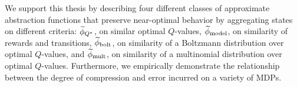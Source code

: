 We support this thesis by describing four different classes of approximate abstraction functions that preserve near-optimal behavior by aggregating states on different criteria: $\widetilde \phi_{Q^*}$, on similar optimal $Q$-values, $\widetilde \phi_{\text{model}}$, on similarity of rewards and transitions, $\widetilde \phi_{\text{bolt}}$, on similarity of a Boltzmann distribution over optimal $Q$-values, and $\widetilde \phi_{\text{mult}}$, on similarity of a multinomial distribution over optimal $Q$-values. Furthermore, we empirically demonstrate the relationship between the degree of compression and error incurred on a variety of \acp{MDP}.

